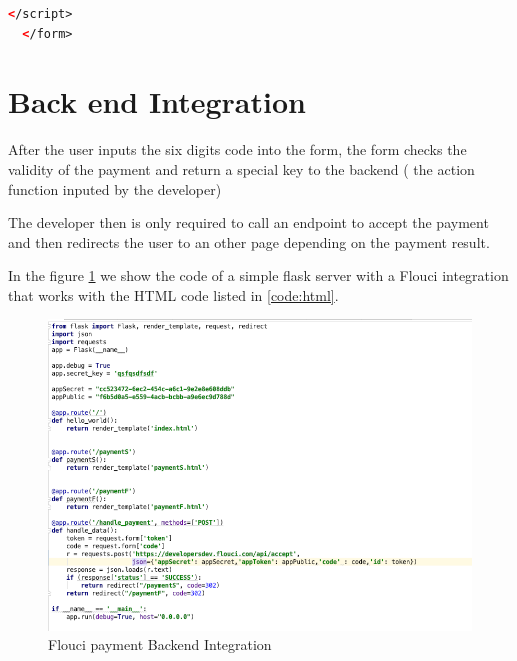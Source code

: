 \begin{spacing}{1.2}
\begin{lstlisting}[label=code:html,caption=Flouci Integration Java,language=xml]
    </script>
  </form>
\end{lstlisting}


\section{Back end Integration}
After the user inputs the six digits code into the form, the form checks the validity of the payment and return a special key to the backend ( the action function inputed by the developer)

The developer then is only required to call an endpoint to accept the payment and then redirects the user to an other page depending on the payment result. 

In the figure \ref{fig:flask} we show the code of a simple flask server with a Flouci integration that works with the HTML code listed in \ref{code:html}.
\begin{figure}[H]\centering
\includegraphics[scale=0.5]{flask.png}
\caption{Flouci payment Backend Integration}
\label{fig:flask}
\end{figure}

\end{spacing}
